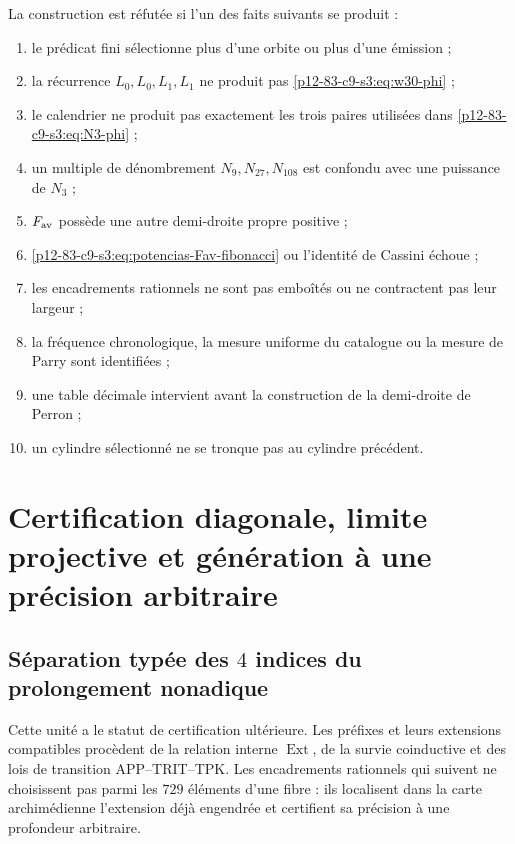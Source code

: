 \begin{criterion}
La construction est réfutée si l'un des faits
suivants se produit :
\begin{enumerate}
 \item le prédicat fini sélectionne plus d’une orbite ou plus d’une émission ;
 \item la récurrence \(L_0,L_0,L_1,L_1\) ne produit pas
       \eqref{p12-83-c9-s3:eq:w30-phi} ;
 \item le calendrier ne produit pas exactement les trois paires utilisées dans
       \eqref{p12-83-c9-s3:eq:N3-phi} ;
 \item un multiple de dénombrement \(N_{9},N_{27},N_{108}\) est confondu avec une
       puissance de \(N_3\) ;
 \item \(F_{\rm av}\) possède une autre demi-droite propre positive ;
 \item \eqref{p12-83-c9-s3:eq:potencias-Fav-fibonacci} ou l’identité de Cassini échoue ;
 \item les encadrements rationnels ne sont pas emboîtés ou ne contractent pas leur largeur ;
 \item la fréquence chronologique, la mesure uniforme du
       catalogue ou la mesure de Parry sont identifiées ;
 \item une table décimale intervient avant la construction de la demi-droite de Perron ;
 \item un cylindre sélectionné ne se tronque pas au cylindre précédent.
\end{enumerate}
\end{criterion}



\section{Certification diagonale, limite projective et génération à une précision arbitraire}
\label{p12-83-c9-s4:chap:precision-arbitraria-constantes}

\subsection{Séparation typée des \(4\) indices du prolongement nonadique}

Cette unité a le statut de certification ultérieure. Les préfixes et leurs
extensions compatibles procèdent de la relation interne
\(\operatorname{Ext}\), de la survie coinductive et des lois de
transition APP--TRIT--TPK. Les encadrements rationnels qui suivent ne choisissent pas
parmi les \(729\) éléments d’une fibre : ils localisent dans la carte archimédienne
l’extension déjà engendrée et certifient sa précision à une profondeur arbitraire.

